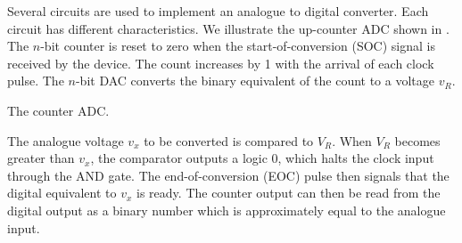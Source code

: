 \begin{slide}\label{slide:compare}
\begin{center}
\end{center}
\end{slide}

Several circuits are used to implement an analogue to digital
converter. Each circuit has different characteristics. We illustrate
the up-counter ADC shown in . The $n$-bit counter is
reset to zero when the start-of-conversion (SOC) signal is received by
the device. The count increases by 1 with the arrival of each clock
pulse. The $n$-bit DAC converts the binary equivalent of the count to
a voltage $v_R$. 

\begin{slide}\label{slide:ADC}
The counter ADC.
\begin{center}
\end{center}
\end{slide}

The analogue voltage $v_x$ to be converted is compared to $V_R$. When
$V_R$ becomes greater than $v_x$, the comparator outputs a logic 0,
which halts the clock input through the AND gate. The
end-of-conversion (EOC) pulse then signals that the digital equivalent
to $v_x$ is ready. The counter output can then be read from the
digital output as a binary number which is approximately equal to the
analogue input.

